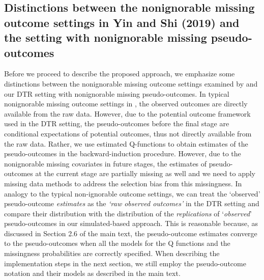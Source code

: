 \documentclass[12pt]{article}
\begin{document}

\subsection{Distinctions between the nonignorable missing outcome settings in Yin and Shi (2019)  and the setting with nonignorable missing pseudo-outcomes}
Before we proceed to describe the proposed approach, we emphasize some distinctions between the nonignorable missing outcome settings examined by \cite{yin2019simulation} and our DTR setting with nonignorable missing pseudo-outcomes.  In typical nonignorable missing outcome settings in \cite{yin2019simulation}, the observed outcomes are directly available from the raw data. However, due to the potential outcome framework used in the DTR setting, the  pseudo-outcomes before the final stage are conditional expectations of  potential outcomes, thus not directly available from the raw data. Rather, we use estimated Q-functions to obtain estimates of the pseudo-outcomes in the backward-induction procedure. However, due to the nonignorable missing covariates in future stages, the estimates of pseudo-outcomes at the current  stage are partially missing as well and we need to apply missing data methods to address the selection bias from this missingness.  In analogy to the typical non-ignorable outcome settings, we can treat the `observed' pseudo-outcome \textit{estimates} as the \textit{`raw observed outcomes'}  in the DTR setting and  compare their distribution with the distribution of the \textit{replications} of  `\textit{observed}' pseudo-outcomes  in our simulated-based approach. This is reasonable because,  as discussed in Section 2.6 of the main text, the pseudo-outcome estimates converge to the pseudo-outcomes when all the models for the Q functions and the missingness probabilities are correctly specified. When describing  the implementation steps in the next section, we still employ the pseudo-outcome notation and  their models as described in the main text.  
 
\end{document}
